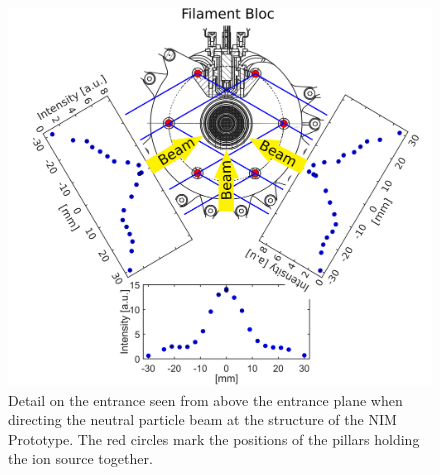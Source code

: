 	\begin{figure}[h!]
		\centering
		\includegraphics[width=\textwidth]{Experiments/Entrence_Proto_topview.png}
		\caption{Detail on the entrance seen from above the entrance plane when directing the neutral particle beam at the structure of the NIM Prototype. The red circles mark the positions of the pillars holding the ion source together.}
		\label{exp:ProtoIntCharEnt}
	\end{figure}
	
	
